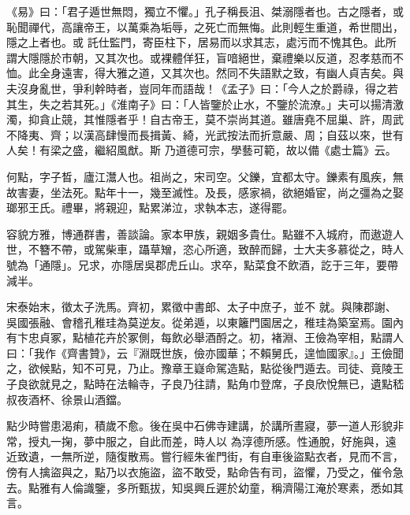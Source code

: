 
\begin{pinyinscope}

 《易》曰：「君子遁世無悶，獨立不懼。」孔子稱長沮、桀溺隱者也。古之隱者，或恥聞禪代，高讓帝王，以萬乘為垢辱，之死亡而無悔。此則輕生重道，希世間出，隱之上者也。或
 託仕監門，寄臣柱下，居易而以求其志，處污而不愧其色。此所謂大隱隱於市朝，又其次也。或裸體佯狂，盲喑絕世，棄禮樂以反道，忍孝慈而不恤。此全身遠害，得大雅之道，又其次也。然同不失語默之致，有幽人貞吉矣。與夫沒身亂世，爭利幹時者，豈同年而語哉！《孟子》曰：「今人之於爵祿，得之若其生，失之若其死。」《淮南子》曰：「人皆鑒於止水，不鑒於流潦。」夫可以揚清激濁，抑貪止競，其惟隱者乎！自古帝王，莫不崇尚其道。雖唐堯不屈巢、許，周武不降夷、齊；以漢高肆慢而長揖黃、綺，光武按法而折意嚴、周；自茲以來，世有人矣！有梁之盛，繼紹風猷。斯
 乃道德可宗，學藝可範，故以備《處士篇》云。



 何點，字子晳，廬江灊人也。祖尚之，宋司空。父鑠，宜都太守。鑠素有風疾，無故害妻，坐法死。點年十一，幾至滅性。及長，感家禍，欲絕婚宦，尚之彊為之娶瑯邪王氏。禮畢，將親迎，點累涕泣，求執本志，遂得罷。



 容貌方雅，博通群書，善談論。家本甲族，親姻多貴仕。點雖不入城府，而遨遊人世，不簪不帶，或駕柴車，躡草矰，恣心所適，致醉而歸，士大夫多慕從之，時人號為「通隱」。兄求，亦隱居吳郡虎丘山。求卒，點菜食不飲酒，訖于三年，要帶減半。



 宋泰始末，徵太子洗馬。齊初，累徵中書郎、太子中庶子，並不
 就。與陳郡謝、吳國張融、會稽孔稚珪為莫逆友。從弟遁，以東籬門園居之，稚珪為築室焉。園內有卞忠貞冢，點植花卉於冢側，每飲必舉酒酹之。初，褚淵、王儉為宰相，點謂人曰：「我作《齊書贊》，云『淵既世族，儉亦國華；不賴舅氏，遑恤國家』。」王儉聞之，欲候點，知不可見，乃止。豫章王嶷命駕造點，點從後門遁去。司徒、竟陵王子良欲就見之，點時在法輪寺，子良乃往請，點角巾登席，子良欣悅無已，遺點嵇叔夜酒杯、徐景山酒鐺。



 點少時嘗患渴痢，積歲不愈。後在吳中石佛寺建講，於講所晝寢，夢一道人形貌非常，授丸一掬，夢中服之，自此而差，時人以
 為淳德所感。性通脫，好施與，遠近致遺，一無所逆，隨復散焉。嘗行經朱雀門街，有自車後盜點衣者，見而不言，傍有人擒盜與之，點乃以衣施盜，盜不敢受，點命告有司，盜懼，乃受之，催令急去。點雅有人倫識鑒，多所甄拔，知吳興丘遲於幼童，稱濟陽江淹於寒素，悉如其言。




\end{pinyinscope}
